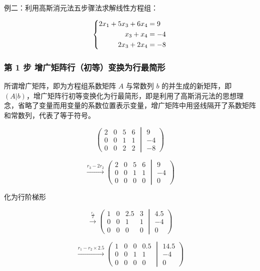 例二：利用高斯消元法五步骤法求解线性方程组：

$$
\left\{\begin{aligned}
2x_1+5x_3+6x_4&=9 \notag \\
x_3+x_4&=-4 \notag \\
2x_3+2x_4&=-8 \notag
\end{aligned}\right.
$$

\subsubsection{第 1 步  增广矩阵行（初等）变换为行最简形}

所谓增广矩阵，即为方程组系数矩阵 $A$ 与常数列 $b$ 的并生成的新矩阵，即 $(A | b)$，增广矩阵行初等变换化为行最简形，即是利用了高斯消元法的思想理念，省略了变量而用变量的系数位置表示变量，增广矩阵中用竖线隔开了系数矩阵和常数列，代表了等于符号。

$$
\left(\begin{matrix}
2 & 0 & 5 & 6 \\
0 & 0 & 1 & 1 \\
0 & 0 & 2 & 2
\end{matrix} \middle|
\begin{matrix}
9 \\
-4 \\
-8
\end{matrix} \right)
$$

$$
\xrightarrow{r_3-2r_2}
\left(\begin{matrix}
2 & 0 & 5 & 6 \\
0 & 0 & 1 & 1 \\
0 & 0 & 0 & 0
\end{matrix} \middle|
\begin{matrix}
9 \\
-4 \\
0
\end{matrix} \right)
$$

化为行阶梯形

$$
\xrightarrow{\frac{r_1}{2}}
\left(\begin{matrix}
1 & 0 & 2.5 & 3 \\
0 & 0 & 1 & 1 \\
0 & 0 & 0 & 0
\end{matrix} \middle|
\begin{matrix}
4.5 \\
-4 \\
0
\end{matrix} \right)
$$

$$
\xrightarrow{r_1-r_2 \times 2.5}
\left(\begin{matrix}
1 & 0 & 0 & 0.5 \\
0 & 0 & 1 & 1 \\
0 & 0 & 0 & 0
\end{matrix} \middle|
\begin{matrix}
14.5 \\
-4 \\
0
\end{matrix} \right)
$$

